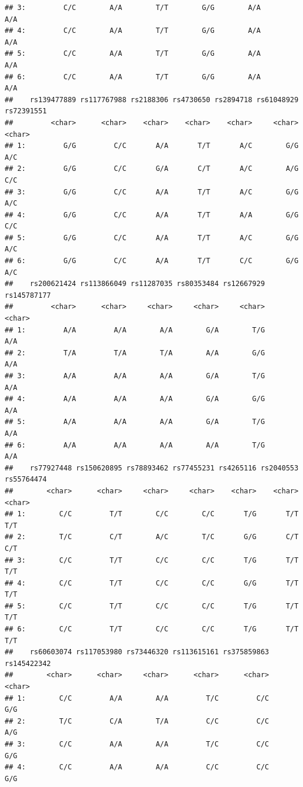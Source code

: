 \documentclass[
]{article}
\begin{document}
\begin{verbatim}
## 3:         C/C        A/A        T/T        G/G        A/A        A/A
## 4:         C/C        A/A        T/T        G/G        A/A        A/A
## 5:         C/C        A/A        T/T        G/G        A/A        A/A
## 6:         C/C        A/A        T/T        G/G        A/A        A/A
##    rs139477889 rs117767988 rs2188306 rs4730650 rs2894718 rs61048929 rs72391551
##         <char>      <char>    <char>    <char>    <char>     <char>     <char>
## 1:         G/G         C/C       A/A       T/T       A/C        G/G        A/C
## 2:         G/G         C/C       G/A       C/T       A/C        A/G        C/C
## 3:         G/G         C/C       A/A       T/T       A/C        G/G        A/C
## 4:         G/G         C/C       A/A       T/T       A/A        G/G        C/C
## 5:         G/G         C/C       A/A       T/T       A/C        G/G        A/C
## 6:         G/G         C/C       A/A       T/T       C/C        G/G        A/C
##    rs200621424 rs113866049 rs11287035 rs80353484 rs12667929 rs145787177
##         <char>      <char>     <char>     <char>     <char>      <char>
## 1:         A/A         A/A        A/A        G/A        T/G         A/A
## 2:         T/A         T/A        T/A        A/A        G/G         A/A
## 3:         A/A         A/A        A/A        G/A        T/G         A/A
## 4:         A/A         A/A        A/A        G/A        G/G         A/A
## 5:         A/A         A/A        A/A        G/A        T/G         A/A
## 6:         A/A         A/A        A/A        A/A        T/G         A/A
##    rs77927448 rs150620895 rs78893462 rs77455231 rs4265116 rs2040553 rs55764474
##        <char>      <char>     <char>     <char>    <char>    <char>     <char>
## 1:        C/C         T/T        C/C        C/C       T/G       T/T        T/T
## 2:        T/C         C/T        A/C        T/C       G/G       C/T        C/T
## 3:        C/C         T/T        C/C        C/C       T/G       T/T        T/T
## 4:        C/C         T/T        C/C        C/C       G/G       T/T        T/T
## 5:        C/C         T/T        C/C        C/C       T/G       T/T        T/T
## 6:        C/C         T/T        C/C        C/C       T/G       T/T        T/T
##    rs60603074 rs117053980 rs73446320 rs113615161 rs375859863 rs145422342
##        <char>      <char>     <char>      <char>      <char>      <char>
## 1:        C/C         A/A        A/A         T/C         C/C         G/G
## 2:        T/C         C/A        T/A         C/C         C/C         A/G
## 3:        C/C         A/A        A/A         T/C         C/C         G/G
## 4:        C/C         A/A        A/A         C/C         C/C         G/G

\end{verbatim}
\end{document}
